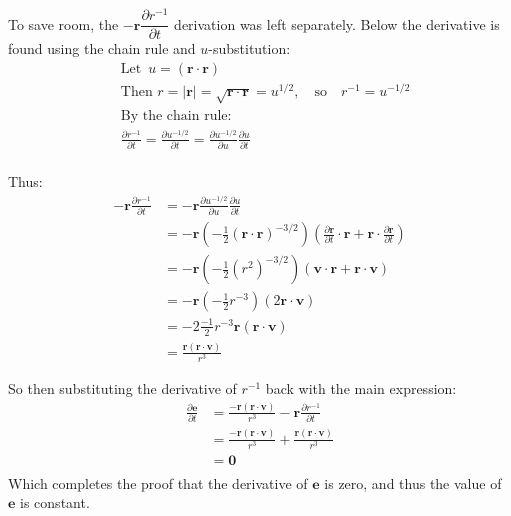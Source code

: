 \documentclass[titlepage]{article}
\begin{document}
To save room, the $-\boldsymbol{r}\dfrac{\partial r^{-1}}{\partial t}$ derivation was left separately. Below the derivative is found using the chain rule and $u$-substitution:
\begin{equation}
	\begin{split}
		&\text{Let }\, u=\left(\boldsymbol{r}\cdot\boldsymbol{r}\right)\\
		&\text{Then } r = |\boldsymbol{r}| = \sqrt{\boldsymbol{r}\cdot\boldsymbol{r}} = u^{1/2}, \quad\text{so}\quad r^{-1}=u^{-1/2}\\
		&\text{By the chain rule:}\\
		&\frac{\partial r^{-1}}{\partial t}=\frac{\partial u^{-1/2}}{\partial t}=\frac{\partial u^{-1/2}}{\partial u}\frac{\partial u}{\partial t}\\
	\end{split}
\end{equation}

Thus:
\begin{equation}
	\begin{split}
		-\boldsymbol{r}\frac{\partial r^{-1}}{\partial t}&=-\boldsymbol{r}\frac{\partial u^{-1/2}}{\partial u}\frac{\partial u}{\partial t}\\
		&=-\boldsymbol{r}\left(-\frac{1}{2}\left(\boldsymbol{r}\cdot\boldsymbol{r}\right)^{-3/2}\right)\left(\frac{\partial\boldsymbol{r}}{\partial t}\cdot\boldsymbol{r}+\boldsymbol{r}\cdot\frac{\partial\boldsymbol{r}}{\partial t}\right)\\
		&=-\boldsymbol{r}\left(-\frac{1}{2}\left(r^2\right)^{-3/2}\right)\left(\boldsymbol{v}\cdot\boldsymbol{r}+\boldsymbol{r}\cdot\boldsymbol{v}\right)\\
		&=-\boldsymbol{r}\left(-\frac{1}{2}r^{-3}\right)\left(2\boldsymbol{r}\cdot\boldsymbol{v}\right)\\
		&=-2\frac{-1}{2}r^{-3}\boldsymbol{r}\left(\boldsymbol{r}\cdot\boldsymbol{v}\right)\\
		&=\frac{\boldsymbol{r}\left(\boldsymbol{r}\cdot\boldsymbol{v}\right)}{r^{3}}
	\end{split}
\end{equation}

\begin{mdframed}[linewidth=1pt, innertopmargin=10pt, innerbottommargin=10pt]
	So then substituting the derivative of $r^{-1}$ back with the main expression:
	\begin{equation}
		\begin{split}
			\frac{\partial\boldsymbol{e}}{\partial t}&=\frac{-\boldsymbol{r}\left(\boldsymbol{r}\cdot\boldsymbol{v}\right)}{r^3}-\boldsymbol{r}\frac{\partial r^{-1}}{\partial t}\\
			&=\frac{-\boldsymbol{r}\left(\boldsymbol{r}\cdot\boldsymbol{v}\right)}{r^3}+\frac{\boldsymbol{r}\left(\boldsymbol{r}\cdot\boldsymbol{v}\right)}{r^{3}}\\
			&=\boldsymbol{0}\\
		\end{split}
	\end{equation}
	Which completes the proof that the derivative of $\boldsymbol{e}$ is zero, and thus the value of $\boldsymbol{e}$ is constant.
\end{mdframed}
\end{document}
